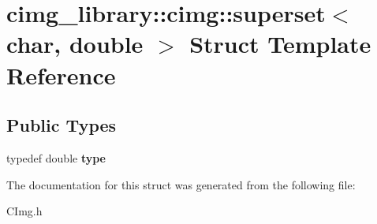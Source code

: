 \hypertarget{structcimg__library_1_1cimg_1_1superset_3_01char_00_01double_01_4}{\section{cimg\-\_\-library\-:\-:cimg\-:\-:superset$<$ char, double $>$ Struct Template Reference}
\label{structcimg__library_1_1cimg_1_1superset_3_01char_00_01double_01_4}
}
\subsection*{Public Types}
\begin{DoxyCompactItemize}
\item 
\hypertarget{structcimg__library_1_1cimg_1_1superset_3_01char_00_01double_01_4_a3db283e90b8ae017fbdf07bfa97d48b3}{typedef double {\bfseries type}}\label{structcimg__library_1_1cimg_1_1superset_3_01char_00_01double_01_4_a3db283e90b8ae017fbdf07bfa97d48b3}

\end{DoxyCompactItemize}


The documentation for this struct was generated from the following file\-:\begin{DoxyCompactItemize}
\item 
C\-Img.\-h\end{DoxyCompactItemize}
